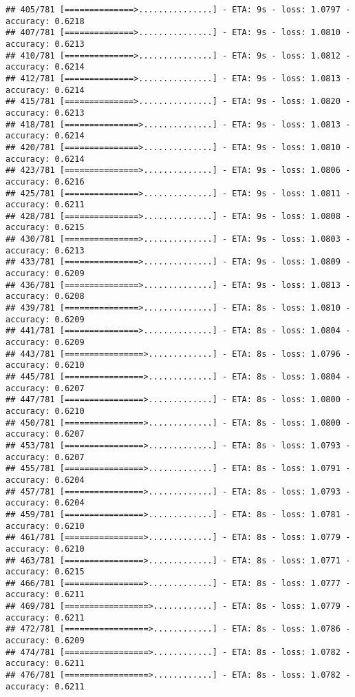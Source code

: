 \documentclass[
]{article}
\begin{document}
\begin{verbatim}
## 405/781 [==============>...............] - ETA: 9s - loss: 1.0797 - accuracy: 0.6218
## 407/781 [==============>...............] - ETA: 9s - loss: 1.0810 - accuracy: 0.6213
## 410/781 [==============>...............] - ETA: 9s - loss: 1.0812 - accuracy: 0.6214
## 412/781 [==============>...............] - ETA: 9s - loss: 1.0813 - accuracy: 0.6214
## 415/781 [==============>...............] - ETA: 9s - loss: 1.0820 - accuracy: 0.6213
## 418/781 [===============>..............] - ETA: 9s - loss: 1.0813 - accuracy: 0.6214
## 420/781 [===============>..............] - ETA: 9s - loss: 1.0810 - accuracy: 0.6214
## 423/781 [===============>..............] - ETA: 9s - loss: 1.0806 - accuracy: 0.6216
## 425/781 [===============>..............] - ETA: 9s - loss: 1.0811 - accuracy: 0.6211
## 428/781 [===============>..............] - ETA: 9s - loss: 1.0808 - accuracy: 0.6215
## 430/781 [===============>..............] - ETA: 9s - loss: 1.0803 - accuracy: 0.6213
## 433/781 [===============>..............] - ETA: 9s - loss: 1.0809 - accuracy: 0.6209
## 436/781 [===============>..............] - ETA: 9s - loss: 1.0813 - accuracy: 0.6208
## 439/781 [===============>..............] - ETA: 8s - loss: 1.0810 - accuracy: 0.6209
## 441/781 [===============>..............] - ETA: 8s - loss: 1.0804 - accuracy: 0.6209
## 443/781 [================>.............] - ETA: 8s - loss: 1.0796 - accuracy: 0.6210
## 445/781 [================>.............] - ETA: 8s - loss: 1.0804 - accuracy: 0.6207
## 447/781 [================>.............] - ETA: 8s - loss: 1.0800 - accuracy: 0.6210
## 450/781 [================>.............] - ETA: 8s - loss: 1.0800 - accuracy: 0.6207
## 453/781 [================>.............] - ETA: 8s - loss: 1.0793 - accuracy: 0.6207
## 455/781 [================>.............] - ETA: 8s - loss: 1.0791 - accuracy: 0.6204
## 457/781 [================>.............] - ETA: 8s - loss: 1.0793 - accuracy: 0.6204
## 459/781 [================>.............] - ETA: 8s - loss: 1.0781 - accuracy: 0.6210
## 461/781 [================>.............] - ETA: 8s - loss: 1.0779 - accuracy: 0.6210
## 463/781 [================>.............] - ETA: 8s - loss: 1.0771 - accuracy: 0.6215
## 466/781 [================>.............] - ETA: 8s - loss: 1.0777 - accuracy: 0.6211
## 469/781 [=================>............] - ETA: 8s - loss: 1.0779 - accuracy: 0.6211
## 472/781 [=================>............] - ETA: 8s - loss: 1.0786 - accuracy: 0.6209
## 474/781 [=================>............] - ETA: 8s - loss: 1.0782 - accuracy: 0.6211
## 476/781 [=================>............] - ETA: 8s - loss: 1.0782 - accuracy: 0.6211

\end{verbatim}
\end{document}
